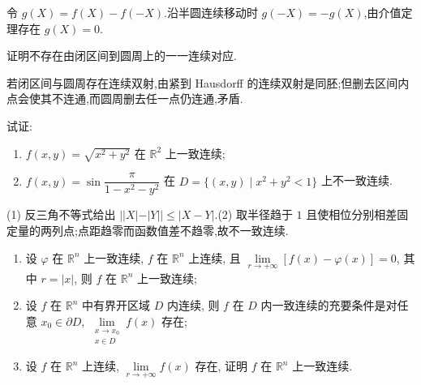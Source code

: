 \begin{solution}
    令 $g(X)=f(X)-f(-X)$.沿半圆连续移动时 $g(-X)=-g(X)$,由介值定理存在 $g(X)=0$.
\end{solution}

\begin{example}
    证明不存在由闭区间到圆周上的一一连续对应.
\end{example}
\exampleblank

\begin{solution}
    若闭区间与圆周存在连续双射,由紧到 Hausdorff 的连续双射是同胚;但删去区间内点会使其不连通,而圆周删去任一点仍连通,矛盾.
\end{solution}

\begin{example}
    试证:
    \begin{enumerate}
        \item $f(x,y)=\sqrt{x^2+y^2}$ 在 $\mathbb{R}^2$ 上一致连续;
        \item $\displaystyle f(x,y)=\sin\dfrac{\pi}{1-x^2-y^2}$ 在 $D=\{(x,y)\mid x^2+y^2<1\}$ 上不一致连续.
    \end{enumerate}
\end{example}
\exampleblank

\begin{solution}

    (1) 反三角不等式给出 $||X|-|Y||\leq|X-Y|$.(2) 取半径趋于 $1$ 且使相位分别相差固定量的两列点;点距趋零而函数值差不趋零,故不一致连续.
\end{solution}

\begin{example}
    \begin{enumerate}
        \item 设 $\varphi$ 在 $\mathbb{R}^n$ 上一致连续, $f$ 在 $\mathbb{R}^n$ 上连续, 且 $\displaystyle\lim\limits_{r\to+\infty}[f(x)-\varphi(x)]=0$, 其中 $r=|x|$, 则 $f$ 在 $\mathbb{R}^n$ 上一致连续;
        \item 设 $f$ 在 $\mathbb{R}^n$ 中有界开区域 $D$ 内连续, 则 $f$ 在 $D$ 内一致连续的充要条件是对任意 $x_0\in\partial D$, $\displaystyle\lim\limits_{\substack{x\to x_0\\x\in D}}f(x)$ 存在;
        \item 设 $f$ 在 $\mathbb{R}^n$ 上连续, $\displaystyle\lim\limits_{r\to+\infty}f(x)$ 存在, 证明 $f$ 在 $\mathbb{R}^n$ 上一致连续.
    \end{enumerate}
\end{example}
\exampleblank

